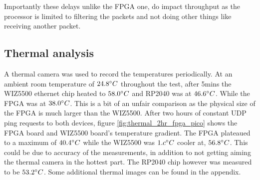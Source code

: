 Importantly these delays unlike the FPGA one, do impact throughput as the processor is limited to filtering the packets and not doing other things like receiving another packet. 

\subsection{Thermal analysis}

A thermal camera was used to record the temperatures periodically. At an ambient room temperature of $24.8\degree C$ throughout the test, after 5mins the WIZ5500 ethernet chip heated to $58.0\degree C$ and RP2040 was at $46.6\degree C$. While the FPGA was at $38.0 \degree C$. This is a bit of an unfair comparison as the physical size of the FPGA is much larger than the WIZ5500. After two hours of constant UDP ping requests to both devices, figure \ref{fig:thermal_2hr_fpga_pico} shows the FPGA board and WIZ5500 board's temperature gradient. The FPGA plateaued to a maximum of $40.4 \degree C$ while the WIZ5500 was $1.c \degree C$ cooler at, $56.8 \degree C$. This could be due to accuracy of the measurements, in addition to not getting aiming the thermal camera in the hottest part. The RP2040 chip however was measured to be $53.2 \degree C$. Some additional thermal images can be found in the appendix. 



